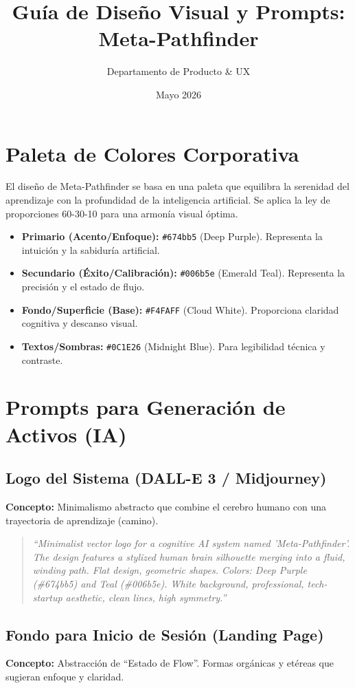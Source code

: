\documentclass{article}
\title{Guía de Diseño Visual y Prompts: Meta-Pathfinder}
\author{Departamento de Producto \& UX}
\date{Mayo 2026}
\begin{document}
\maketitle

\section{Paleta de Colores Corporativa}
El diseño de Meta-Pathfinder se basa en una paleta que equilibra la serenidad del aprendizaje con la profundidad de la inteligencia artificial. Se aplica la ley de proporciones 60-30-10 para una armonía visual óptima.

\begin{itemize}
    \item \textbf{Primario (Acento/Enfoque):} \texttt{\#674bb5} (Deep Purple). Representa la intuición y la sabiduría artificial.
    \item \textbf{Secundario (Éxito/Calibración):} \texttt{\#006b5e} (Emerald Teal). Representa la precisión y el estado de flujo.
    \item \textbf{Fondo/Superficie (Base):} \texttt{\#F4FAFF} (Cloud White). Proporciona claridad cognitiva y descanso visual.
    \item \textbf{Textos/Sombras:} \texttt{\#0C1E26} (Midnight Blue). Para legibilidad técnica y contraste.
\end{itemize}

\section{Prompts para Generación de Activos (IA)}

\subsection{Logo del Sistema (DALL-E 3 / Midjourney)}
\textbf{Concepto:} Minimalismo abstracto que combine el cerebro humano con una trayectoria de aprendizaje (camino).

\begin{quote}
    \textit{``Minimalist vector logo for a cognitive AI system named 'Meta-Pathfinder'. The design features a stylized human brain silhouette merging into a fluid, winding path. Flat design, geometric shapes. Colors: Deep Purple (\#674bb5) and Teal (\#006b5e). White background, professional, tech-startup aesthetic, clean lines, high symmetry.''}
\end{quote}

\subsection{Fondo para Inicio de Sesión (Landing Page)}
\textbf{Concepto:} Abstracción de ``Estado de Flow''. Formas orgánicas y etéreas que sugieran enfoque y claridad.
\end{document}
